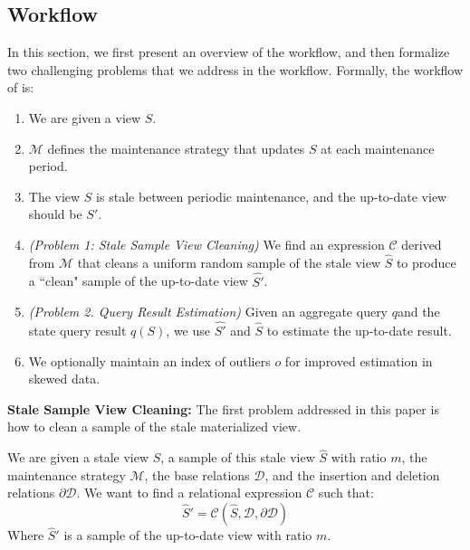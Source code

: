 

\subsection{\svc Workflow}
In this section, we first present an overview of the \svc workflow, and then formalize two challenging problems that we address in the workflow. Formally, the workflow of \svc is:
\begin{enumerate}[noitemsep]
\item We are given a view $S$.
\item $\mathcal{M}$ defines the maintenance strategy that updates $S$ at each maintenance period.
\item The view $S$ is stale between periodic maintenance, and the up-to-date view should be $S'$.
\item \emph{(Problem 1: Stale Sample View Cleaning)} We find an expression $\mathcal{C}$ derived from $\mathcal{M}$ 
that cleans a uniform random sample of the stale view $\widehat{S}$ to produce a ``clean" sample of the up-to-date
view $\widehat{S'}$.
\item \emph{(Problem 2. Query Result Estimation)} Given an aggregate query $q$and the state query result $q(S)$, we use $\widehat{S'}$ and $\widehat{S}$ to estimate the up-to-date result.
\item We optionally maintain an index of outliers $o$ for improved estimation in skewed data.
\end{enumerate} 

\noindent\textbf{Stale Sample View Cleaning: }
The first problem addressed in this paper is how to clean a sample of the stale materialized view.
\begin{problem}
We are given a stale view $S$, a sample of this stale view $\widehat{S}$ with ratio $m$, the maintenance strategy $\mathcal{M}$, the base relations $\mathcal{D}$, and
the insertion and deletion relations $\partial \mathcal{D}$.
We want to find a relational expression $\mathcal{C}$ such that:
\[
\widehat{S}' = \mathcal{C}(\widehat{S},\mathcal{D},\partial \mathcal{D})
\]
Where $\widehat{S}'$ is a sample of the up-to-date view with ratio $m$. 
\end{problem}

